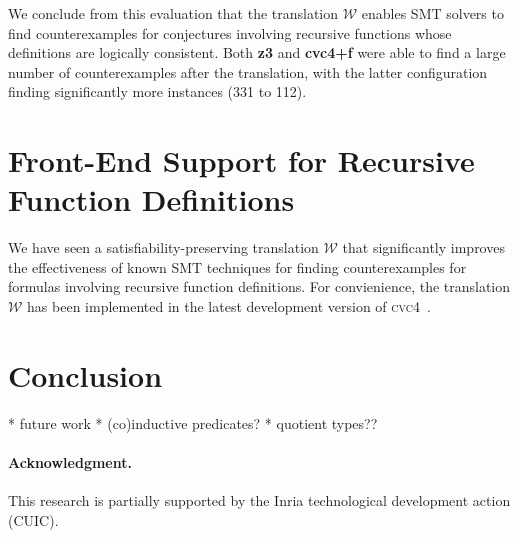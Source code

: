 \documentclass[runningheads,a4paper]{llncs}
\newcommand{\cvc}{\textsc{cvc}{\small 4}\xspace}
\newcommand{\conv}{\mathcal{W}}
\begin{document}
We conclude from this evaluation that the translation $\conv$ enables SMT solvers to find counterexamples 
for conjectures involving recursive functions whose definitions are logically consistent.
Both {\bf z3} and {\bf cvc4+f} were able to find a large number of counterexamples after the translation,
with the latter configuration finding significantly more instances (331 to 112).

\section{Front-End Support for Recursive Function Definitions}
\label{sec:front-end}

We have seen a satisfiability-preserving translation $\conv$ that significantly improves the effectiveness of known SMT techniques
for finding counterexamples for formulas involving recursive function definitions.
For convienience, the translation $\conv$ has been implemented in the latest development version of \cvc~\cite{ReyEtAl-1-RR-13}.



\section{Conclusion}
\label{sec:conclusion}

  * future work
    * (co)inductive predicates?
    * quotient types??

{%
\def\ackname{Acknowledgment}
\paragraph{%
\ackname.}

This research is partially supported by the Inria technological development
action  (CUIC).

}



{


}
\end{document}
